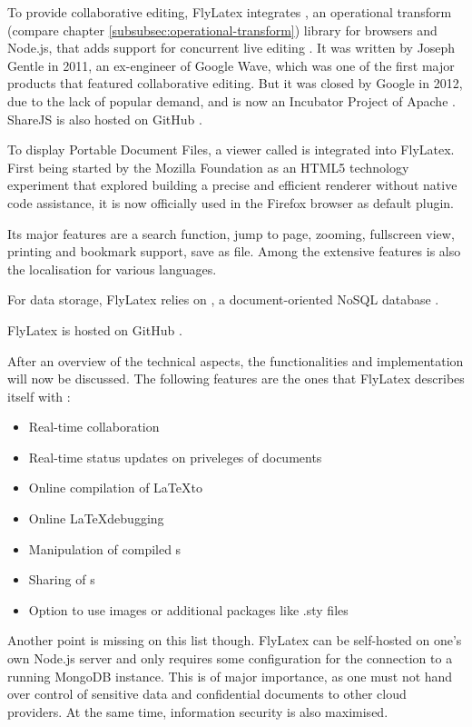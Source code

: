 To provide collaborative editing, FlyLatex integrates , an operational transform (compare chapter \ref{subsubsec:operational-transform}) library for browsers and Node.js, that adds support for concurrent live editing \cite{website:sharejs}. It was written by Joseph Gentle in 2011, an ex-engineer of Google Wave, which was one of the first major products that featured collaborative editing. But it was closed by Google in 2012, due to the lack of popular demand, and is now an Incubator Project of Apache \cite{website:googlewave-status} \cite{website:apache-wave}. ShareJS is also hosted on GitHub \cite{website:sharejs-github}.

To display Portable Document Files, a viewer called  is integrated into FlyLatex. First being started by the Mozilla Foundation as an HTML5 technology experiment that explored building a precise and efficient renderer without native code assistance, it is now officially used in the Firefox browser as default plugin. 

Its major features are a search function, jump to page, zooming, fullscreen view, printing and bookmark support, save as file. Among the extensive features is also the localisation for various languages.

For data storage, FlyLatex relies on , a document-oriented NoSQL database \cite{website:mongo-db}.

FlyLatex is hosted on GitHub \cite{website:flylatex-github}.

After an overview of the technical aspects, the functionalities and implementation will now be discussed. The following features are the ones that FlyLatex describes itself with \cite{website:flylatex-github}:

\begin{itemize}
	\item{Real-time collaboration}
	\item{Real-time status updates on priveleges of documents}
	\item{Online compilation of \LaTeX to }
	\item{Online \LaTeX debugging}
	\item{Manipulation of compiled s}
	\item{Sharing of s}
	\item{Option to use images or additional packages like .sty files}
\end{itemize}

Another point is missing on this list though. FlyLatex can be self-hosted on one's own Node.js server and only requires some configuration for the connection to a running MongoDB instance. This is of major importance, as one must not hand over control of sensitive data and confidential documents to other cloud providers. At the same time, information security is also maximised.

